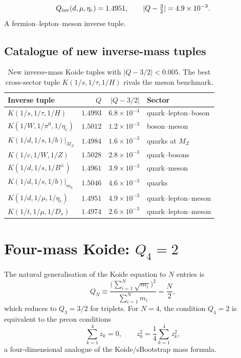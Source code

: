 \documentclass[11pt]{article}
\begin{document}
\begin{equation}
  Q_{\rm inv}(d,\mu,\eta_c) = 1.4951,
  \qquad |Q-\tfrac{3}{2}| = 4.9\times 10^{-3}.
\end{equation}
A fermion--lepton--meson inverse tuple.

\subsection{Catalogue of new inverse-mass tuples}

\begin{table}[h]
\centering\small
\begin{tabular}{@{}l r r l@{}}
\toprule
Inverse tuple & $Q$ & $|Q-3/2|$ & Sector \\
\midrule
$K(1/s,1/\tau,1/H)$ & $1.4993$ & $6.8\times 10^{-4}$ & quark--lepton--boson \\
$K(1/W,1/\pi^0,1/\eta_c)$ & $1.5012$ & $1.2\times 10^{-3}$ & boson--meson \\
$K(1/d,1/s,1/b)\big|_{M_Z}$ & $1.4984$ & $1.6\times 10^{-3}$ & quarks at $M_Z$ \\
$K(1/c,1/W,1/Z)$ & $1.5028$ & $2.8\times 10^{-3}$ & quark--bosons \\
$K(1/d,1/s,1/B^\pm)$ & $1.4961$ & $3.9\times 10^{-3}$ & quark--meson \\
$K(1/d,1/s,1/b)\big|_{m_q}$ & $1.5046$ & $4.6\times 10^{-3}$ & quarks \\
$K(1/d,1/\mu,1/\eta_c)$ & $1.4951$ & $4.9\times 10^{-3}$ & quark--lepton--meson \\
$K(1/t,1/\mu,1/D_s)$ & $1.4974$ & $2.6\times 10^{-3}$ & quark--lepton--meson \\
\bottomrule
\end{tabular}
\caption{New inverse-mass Koide tuples with $|Q-3/2| < 0.005$.
The best cross-sector tuple $K(1/s,1/\tau,1/H)$ rivals the
meson benchmark.}
\end{table}

\section{Four-mass Koide: $Q_4 = 2$}

The natural generalisation of the Koide equation to $N$ entries is
\begin{equation}
  Q_N \equiv \frac{\bigl(\sum_{i=1}^N \sqrt{m_i}\bigr)^2}
  {\sum_{i=1}^N m_i} = \frac{N}{2},
  \label{eq:QN}
\end{equation}
which reduces to $Q_3 = 3/2$ for triplets.
For $N=4$, the condition $Q_4 = 2$ is equivalent to the
preon conditions
\begin{equation}
  \sum_{k=1}^4 z_k = 0, \qquad
  z_0^2 = \frac{1}{4}\sum_{k=1}^4 z_k^2,
\end{equation}
a four-dimensional analogue of the Koide/sBootstrap mass formula.
\end{document}
